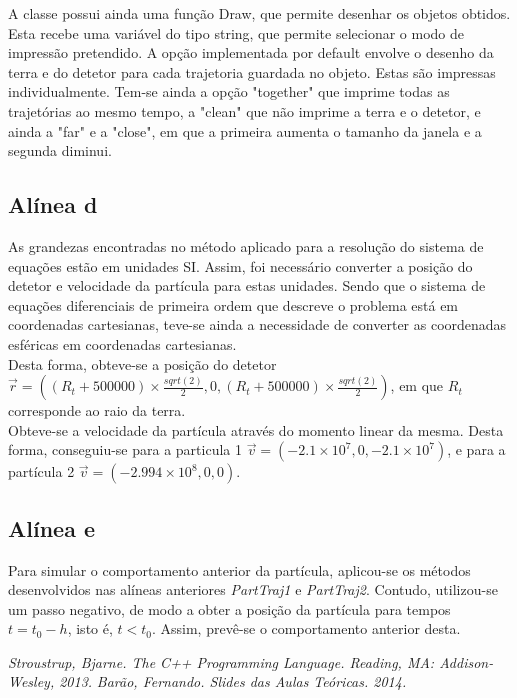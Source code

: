 \documentclass{article}
\begin{document}
\begin{multicols}{2}
A classe possui ainda uma função Draw, que permite desenhar os objetos obtidos. Esta recebe uma variável do tipo string, que permite selecionar o modo de impressão pretendido. A opção implementada por default envolve o desenho da terra e do detetor para cada trajetoria guardada no objeto. Estas são impressas individualmente. Tem-se ainda a opção "together" que imprime todas as trajetórias ao mesmo tempo, a "clean" que não imprime a terra e o detetor, e ainda a "far" e a "close", em que a primeira aumenta o tamanho da janela e a segunda diminui.

\subsection{Alínea d}

As grandezas encontradas no método aplicado para a resolução do sistema de equações estão em unidades SI. Assim, foi necessário converter a posição do detetor e velocidade da partícula para estas unidades. Sendo que o sistema de equações diferenciais de primeira ordem que descreve o problema está em coordenadas cartesianas, teve-se ainda a necessidade de converter as coordenadas esféricas em coordenadas cartesianas.\\

Desta forma, obteve-se a posição do detetor $\vec{r} = ( (R_t + 500000) \times \frac{sqrt(2)}{2} , 0 , (R_t + 500000) \times \frac{sqrt(2)}{2} )$, em que $R_t$ corresponde ao raio da terra.\\

Obteve-se a velocidade da partícula através do momento linear da mesma. Desta forma, conseguiu-se para a particula 1 $\vec{v} = ( -2.1 \times 10^7 , 0 , -2.1 \times 10^7)$, e para a partícula 2 $\vec{v} = ( -2.994 \times 10^8 , 0 , 0 )$.

\subsection{Alínea e}

Para simular o comportamento anterior da partícula, aplicou-se os métodos desenvolvidos nas alíneas anteriores \textit{PartTraj1} e \textit{PartTraj2}. Contudo, utilizou-se um passo negativo, de modo a obter a posição da partícula para tempos $t = t_0 - h$, isto é, $t < t_0$. Assim, prevê-se o comportamento anterior desta.

  \begin{thebibliography}{9}


    \textit{Stroustrup, Bjarne. The C++ Programming Language. Reading, MA: Addison-Wesley, 2013.}
    \textit{Barão, Fernando. Slides das Aulas Teóricas. 2014.}

  \end{thebibliography}
\end{multicols}
\end{document}
